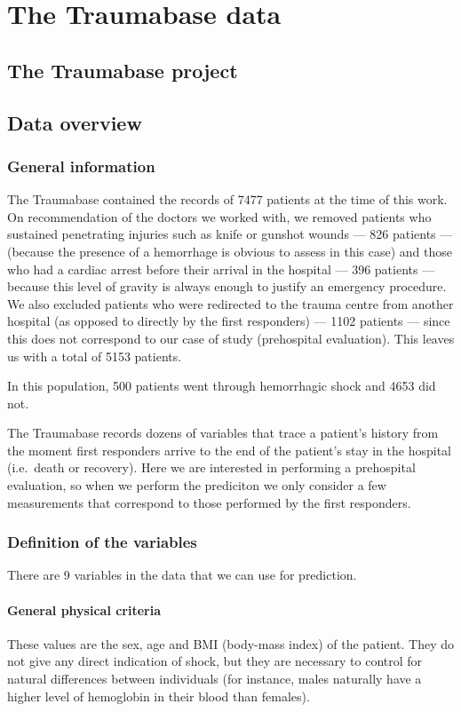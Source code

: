 	\section{The Traumabase data}
	\label{traumabase}
		\subsection{The Traumabase project}
	
		\subsection{Data overview}
		
			\subsubsection{General information}
The Traumabase contained the records of 7477 patients at the time of this work. On recommendation of the doctors we worked with, we removed patients who sustained penetrating injuries such as knife or gunshot wounds --- 826 patients --- (because the presence of a hemorrhage is obvious to assess in this case) and those who had a cardiac arrest before their arrival in the hospital --- 396 patients --- because this level of gravity is always enough to justify an emergency procedure. We also excluded patients who were redirected to the trauma centre from another hospital (as opposed to directly by the first responders) --- 1102 patients --- since this does not correspond to our case of study (prehospital evaluation). This leaves us with a total of 5153 patients.

In this population, 500 patients went through hemorrhagic shock and 4653 did not.
			
The Traumabase records dozens of variables that trace a patient's history from the moment first responders arrive to the end of the patient's stay in the hospital (i.e.\ death or recovery). Here we are interested in performing a prehospital evaluation, so when we perform the prediciton we only consider a few measurements that correspond to those performed by the first responders. 

			\subsubsection{Definition of the variables}
There are 9 variables in the data that we can use for prediction.
\paragraph{General physical criteria}
These values are the sex, age and BMI (body-mass index) of the patient. They do not give any direct indication of shock, but they are necessary to control for natural differences between individuals (for instance, males naturally have a higher level of hemoglobin in their blood than females).

